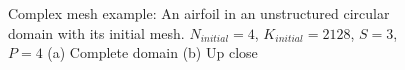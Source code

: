 \begin{figure}[H]
    \centering
    \hfill
    \caption{Complex mesh example: An airfoil in an unstructured circular domain with its initial 
        mesh. \(N_{initial} = 4\), \(K_{initial} = 2128\), \(S = 3\), \(P = 4\) (a) Complete domain 
        (b) Up close}\label{fig:complex_mesh}
\end{figure}

